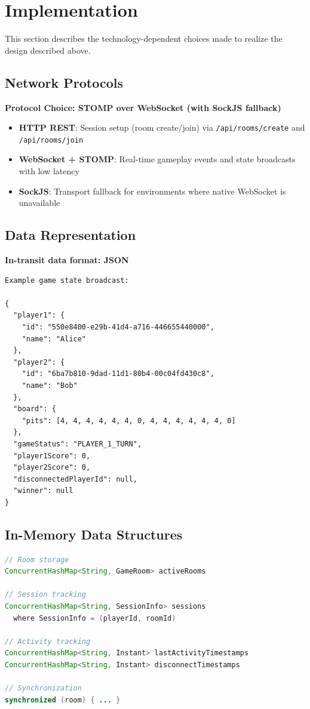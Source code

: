 \documentclass{scrartcl}
\begin{document}
\section{Implementation}\label{implementation}

This section describes the technology-dependent choices made to realize the design described above.

\subsection{Network Protocols}

\textbf{Protocol Choice: STOMP over WebSocket (with SockJS fallback)}

\begin{itemize}
  \item \textbf{HTTP REST}: Session setup (room create/join) via \texttt{/api/rooms/create} and \texttt{/api/rooms/join}
  \item \textbf{WebSocket + STOMP}: Real-time gameplay events and state broadcasts with low latency
  \item \textbf{SockJS}: Transport fallback for environments where native WebSocket is unavailable
\end{itemize}


\subsection{Data Representation}

\textbf{In-transit data format: JSON}

\begin{lstlisting}
Example game state broadcast:

{
  "player1": {
    "id": "550e8400-e29b-41d4-a716-446655440000",
    "name": "Alice"
  },
  "player2": {
    "id": "6ba7b810-9dad-11d1-80b4-00c04fd430c8",
    "name": "Bob"
  },
  "board": {
    "pits": [4, 4, 4, 4, 4, 4, 0, 4, 4, 4, 4, 4, 4, 0]
  },
  "gameStatus": "PLAYER_1_TURN",
  "player1Score": 0,
  "player2Score": 0,
  "disconnectedPlayerId": null,
  "winner": null
}
\end{lstlisting}


\subsection{In-Memory Data Structures}

\begin{lstlisting}[language=java]
// Room storage
ConcurrentHashMap<String, GameRoom> activeRooms

// Session tracking
ConcurrentHashMap<String, SessionInfo> sessions
  where SessionInfo = (playerId, roomId)

// Activity tracking
ConcurrentHashMap<String, Instant> lastActivityTimestamps
ConcurrentHashMap<String, Instant> disconnectTimestamps

// Synchronization
synchronized (room) { ... }
\end{lstlisting}
\end{document}
